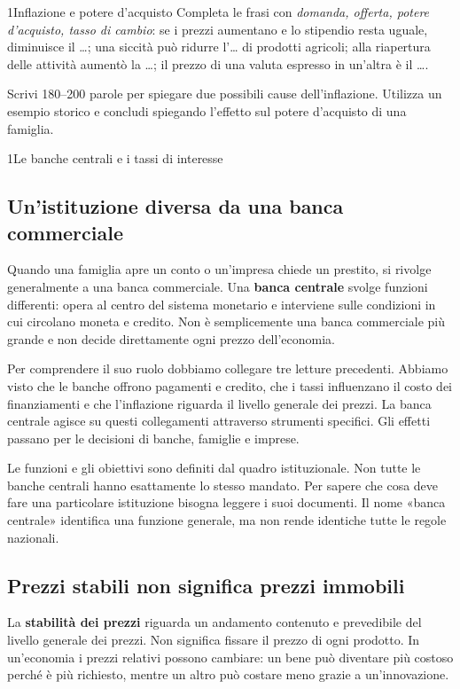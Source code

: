\begin{lettura}{1}{Inflazione e potere d’acquisto}
\lingua
Completa le frasi con \emph{domanda, offerta, potere d'acquisto, tasso di cambio}: se i prezzi aumentano e lo stipendio resta uguale, diminuisce il \ldots; una siccità può ridurre l'\ldots{} di prodotti agricoli; alla riapertura delle attività aumentò la \ldots; il prezzo di una valuta espresso in un'altra è il \ldots.

\scrittura
Scrivi 180--200 parole per spiegare due possibili cause dell'inflazione. Utilizza un esempio storico e concludi spiegando l'effetto sul potere d'acquisto di una famiglia.

\end{lettura}


\begin{lettura}{1}{Le banche centrali e i tassi di interesse}


\subsection*{Un'istituzione diversa da una banca commerciale}
Quando una famiglia apre un conto o un'impresa chiede un prestito, si rivolge generalmente a una banca commerciale. Una \textbf{banca centrale} svolge funzioni differenti: opera al centro del sistema monetario e interviene sulle condizioni in cui circolano moneta e credito. Non è semplicemente una banca commerciale più grande e non decide direttamente ogni prezzo dell'economia.

Per comprendere il suo ruolo dobbiamo collegare tre letture precedenti. Abbiamo visto che le banche offrono pagamenti e credito, che i tassi influenzano il costo dei finanziamenti e che l'inflazione riguarda il livello generale dei prezzi. La banca centrale agisce su questi collegamenti attraverso strumenti specifici. Gli effetti passano per le decisioni di banche, famiglie e imprese.

Le funzioni e gli obiettivi sono definiti dal quadro istituzionale. Non tutte le banche centrali hanno esattamente lo stesso mandato. Per sapere che cosa deve fare una particolare istituzione bisogna leggere i suoi documenti. Il nome «banca centrale» identifica una funzione generale, ma non rende identiche tutte le regole nazionali.

\subsection*{Prezzi stabili non significa prezzi immobili}
La \textbf{stabilità dei prezzi} riguarda un andamento contenuto e prevedibile del livello generale dei prezzi. Non significa fissare il prezzo di ogni prodotto. In un'economia i prezzi relativi possono cambiare: un bene può diventare più costoso perché è più richiesto, mentre un altro può costare meno grazie a un'innovazione.


\end{lettura}
